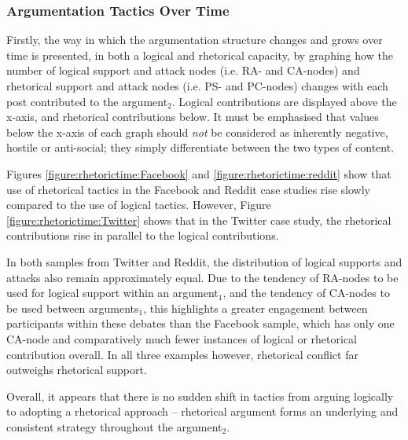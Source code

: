 \newcommand{\scaleResults}{0.4}

\subsubsection{Argumentation Tactics Over Time}
Firstly, the way in which the argumentation structure changes and grows over time is presented, in both a logical and rhetorical capacity, by graphing how the number of logical support and attack nodes (i.e. RA- and CA-nodes) and rhetorical support and attack nodes (i.e. PS- and PC-nodes) changes with each post contributed to the argument$_2$. Logical contributions are displayed above the x-axis, and rhetorical contributions below. It must be emphasised that values below the x-axis of each graph should \textit{not} be considered as inherently negative, hostile or anti-social; they simply differentiate between the two types of content.

Figures \ref{figure:rhetorictime:Facebook} and \ref{figure:rhetorictime:reddit} show that use of rhetorical tactics in the Facebook and Reddit case studies rise slowly compared to the use of logical tactics. However, Figure \ref{figure:rhetorictime:Twitter} shows that in the Twitter case study, the rhetorical contributions rise in parallel to the logical contributions.

In both samples from Twitter and Reddit, the distribution of logical supports and attacks also remain approximately equal. Due to the tendency of RA-nodes to be used for logical support within an argument$_1$, and the tendency of CA-nodes to be used between arguments$_1$, this highlights a greater engagement between participants within these debates than the Facebook sample, which has only one CA-node and comparatively much fewer instances of logical or rhetorical contribution overall. In all three examples however, rhetorical conflict far outweighs rhetorical support.

Overall, it appears that there is no sudden shift in tactics from arguing logically to adopting a rhetorical approach -- rhetorical argument forms an underlying and consistent strategy throughout the argument$_2$.


